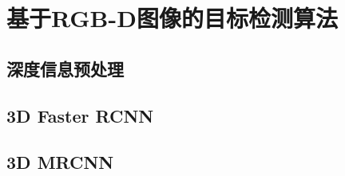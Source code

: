 \chapter{基于RGB-D图像的目标检测算法}

\section{深度信息预处理}

\section{3D Faster RCNN}

\section{3D MRCNN}


\label{chap:detector}